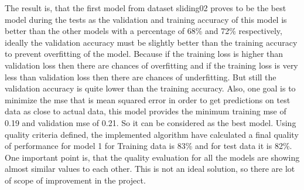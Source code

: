 \begin{table}
\centering
{}
\caption{ Quality Model for models with different hidden units for dataset sliding03}
\label{table:qualitymodelregression2}
\end{table}

The result is, that the first model from dataset sliding02 proves to be the best model during the tests as the  validation and training accuracy of this model is better than the other models with a percentage of 68\% and 72\% respectively, ideally the validation accuracy must be slightly better than the training accuracy to prevent overfitting of the model. Because if the training loss is higher than validation loss then there are chances of overfitting and if the training loss is very less than validation loss then there are chances of underfitting. But still the validation accuracy is quite lower than the training accuracy.\newline
Also, one goal is to minimize the mse that is mean squared error in order to get predictions on test data as close to actual data, this model provides the minimum training mse of 0.19 and validation mse of 0.21. So it can be considered as the best model.\newline
Using quality criteria defined, the implemented algorithm have calculated a final quality of performance for model 1 for Training data is 83\% and for test data it is 82\%. One important point is, that the quality evaluation for all the models are showing almost similar values to each other. This is not an ideal solution, so there are lot of scope of improvement in the project.\newline

